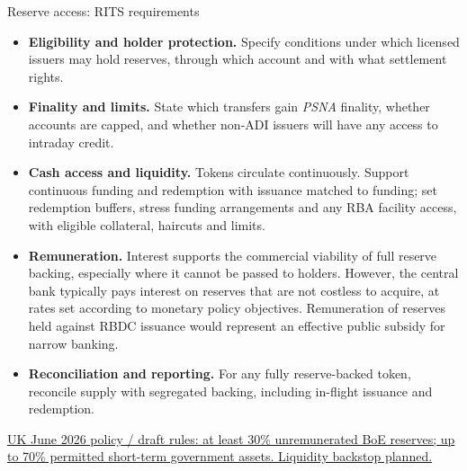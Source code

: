 \documentclass[aspectratio=169,12pt]{beamer}
\makeatletter
\newcommand{\rust}[1]{{\color{Rust}\bfseries\fontsize{\dimexpr\f@size pt+0.7pt\relax}{\f@baselineskip}\selectfont #1}}
\newcommand{\src}[1]{\vfill\par{\fontsize{6.5}{8}\selectfont\color{FootnoteBlue}\hypersetup{urlcolor=FootnoteBlue,linkcolor=FootnoteBlue}#1\par}\vspace*{.18cm}}
\newcommand{\footnotedivider}[1]{%
  \AddToShipoutPictureFG*{\AtPageUpperLeft{%
    \put(\LenToUnit{.44cm},\LenToUnit{-#1cm}){%
      \color{neutline}\rule{15.12cm}{.35pt}}}}}
\makeatother
\begin{document}
\begin{frame}[t]{Reserve access: RITS requirements}
\footnotedivider{8.07}
\fontsize{8.0}{10.0}\selectfont
\begin{minipage}[t][6.0cm][s]{\textwidth}
\vspace{0pt plus 0.35fill}\begin{itemize}\setlength{\itemsep}{2pt plus 2.4fill}
  \item \rust{Eligibility and holder protection.} Specify conditions under which licensed issuers may hold reserves, through which account and with what settlement rights.
  \item \rust{Finality and limits.} State which transfers gain \emph{PSNA} finality, whether accounts are capped, and whether non-ADI issuers will have any access to intraday credit.
  \item \rust{Cash access and liquidity.} Tokens circulate continuously. Support continuous funding and redemption with issuance matched to funding; set redemption buffers, stress funding arrangements and any RBA facility access, with eligible collateral, haircuts and limits.
  \item \rust{Remuneration.} Interest supports the commercial viability of full reserve backing, especially where it cannot be passed to holders. However, the central bank typically pays interest on reserves that are not costless to acquire, at rates set according to monetary policy objectives. Remuneration of reserves held against RBDC issuance would represent an effective public subsidy for narrow banking.
  \item \rust{Reconciliation and reporting.} For any fully reserve-backed token, reconcile supply with segregated backing, including in-flight issuance and redemption.
\end{itemize}\vspace{0pt plus 4fill}
\end{minipage}
\src{\href{https://www.bankofengland.co.uk/paper/2026/ps/sterling-denominated-systemic-stablecoin}{UK June 2026 policy / draft rules: at least 30\% unremunerated BoE reserves; up to 70\% permitted short-term government assets. Liquidity backstop planned.}}\vspace*{-.30cm}
\end{frame}

\end{document}
